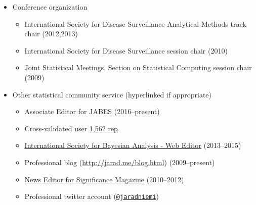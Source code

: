 \documentclass[overlapped,line]{res}
\begin{document}
\begin{resume}
\begin{itemize}
\item Conference organization
 \begin{itemize}
 \item International Society for Disease Surveillance Analytical Methods track chair (2012,2013)
 \item International Society for Disease Surveillance session chair (2010)
 \item Joint Statistical Meetings, Section on Statistical Computing session chair (2009)
 \end{itemize}
\item Other statistical community service (hyperlinked if appropriate)
 \begin{itemize}
 \item Associate Editor for JABES (2016--present)
 \item Cross-validated user \href{http://stats.stackexchange.com/users/40440/jaradniemi}{1,562 rep}
 \item \href{http://bayesian.org/}{International Society for Bayesian Analysis -  Web Editor} (2013--2015)
 \item Professional blog (\url{http://jarad.me/blog.html}) (2009--present)
 \item \href{http://www.significancemagazine.org/view/searchResults.html?s=&t=&q=jarad+niemi}{News Editor for Significance Magazine} (2010--2012)
 \item Professional twitter account ({\tt \href{https://twitter.com/jaradniemi}{@jaradniemi}})
 \end{itemize}


\end{itemize}
\end{resume}
\end{document}
